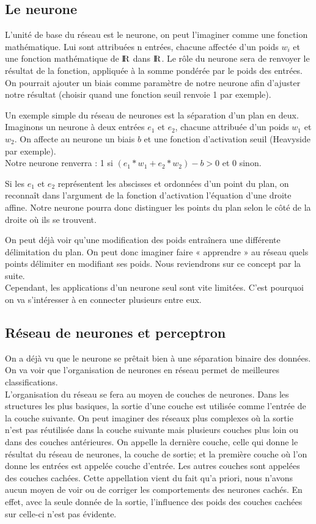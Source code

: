 \subsection{Le neurone} %
\label{sub:le_neurone}
L’unité de base du réseau est le neurone, on peut l’imaginer comme une fonction mathématique. Lui sont attribuées n entrées, chacune affectée d’un poids $w_i$ et une fonction mathématique de $\textrm{I\kern-0.21emR}$ dans $\textrm{I\kern-0.21emR}$. Le rôle du neurone sera de renvoyer le résultat de la fonction, appliquée à la somme pondérée par le poids des entrées. On pourrait ajouter un biais comme paramètre de notre neurone afin d’ajuster notre résultat (choisir quand une fonction seuil renvoie 1 par exemple).

Un exemple simple du réseau de neurones est la séparation d’un plan en deux.\\
Imaginons un neurone à deux entrées $e_1$ et $e_2$, chacune attribuée d’un poids $w_1$ et $w_2$. On affecte au neurone un biais $b$ et une fonction d’activation seuil (Heavyside par exemple).\\
Notre neurone renverra : 1 si $(e_1*w_1+e_2*w_2) - b >0$ et 0 sinon.

Si les $e_1$ et $e_2$ représentent les abscisses et ordonnées d’un point du plan, on reconnaît dans l’argument de la fonction d’activation l’équation d’une droite affine. Notre neurone pourra donc distinguer les points du plan selon le côté de la droite où ils se trouvent.

On peut déjà voir qu’une modification des poids entraînera une différente délimitation du plan. On peut donc imaginer faire « apprendre » au réseau quels points délimiter en modifiant ses poids. Nous reviendrons sur ce concept par la suite.\\
Cependant, les applications d’un neurone seul sont vite limitées. C’est pourquoi on va s’intéresser à en connecter plusieurs entre eux.

\subsection{Réseau de neurones et perceptron} %
\label{sub:reseau_de_neurones}
On a déjà vu que le neurone se prêtait bien à une séparation binaire des données. On va voir que l’organisation de neurones en réseau permet de meilleures classifications.\\
L’organisation du réseau se fera au moyen de couches de neurones. 
Dans les structures les plus basiques, la sortie d'une couche est utilisée comme l'entrée de la couche suivante. On peut imaginer des réseaux plus complexes où la sortie n'est pas réutilisée dans la couche suivante mais plusieurs couches plus loin ou dans des couches antérieures.
On appelle la dernière couche, celle qui donne le résultat du réseau de neurones, la couche de sortie; et la première couche où l'on donne les entrées est appelée couche d'entrée. Les autres couches sont appelées des couches cachées. Cette appellation vient du fait qu’a priori, nous n’avons aucun moyen de voir ou de corriger les comportements des neurones cachés. En effet, avec la seule donnée de la sortie, l’influence des poids des couches cachées sur celle-ci n'est pas évidente.

